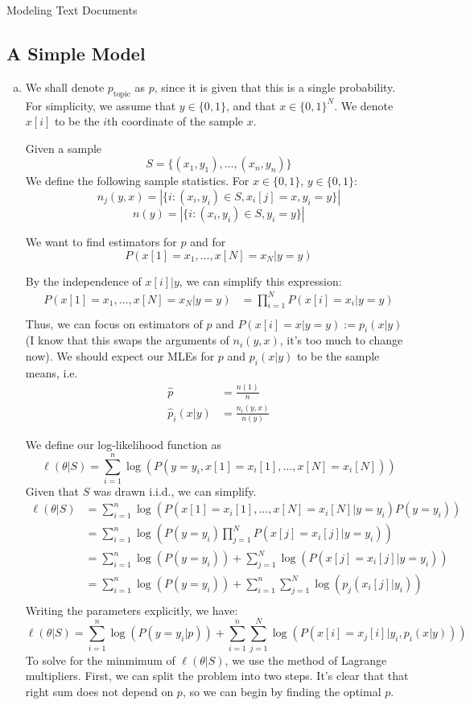 \documentclass{amsart}
\theoremstyle{definition}
\begin{document}
\begin{center}
\LARGE Modeling Text Documents
\end{center}
\subsection{A Simple Model}
\begin{enumerate}[(a)]
  	\item 
		We shall denote $p_{\mathrm{topic}}$ as $p$, since it is given that this is a single probability. 
		For simplicity, we assume that $y \in \{0, 1\}$, and that $x \in \{0, 1\}^N$.
		We denote $x[i]$ to be the $i$th coordinate of the sample $x$. 

		Given a sample 
		\[
		S = \{(x_1,y_1), \ldots, (x_n, y_n)\}
		\]
		We define the following sample statistics. For $x \in \{0,1\}$, $y \in \{0,1\}$:
		\[n_j(y, x) = |\{i : (x_i, y_i)\in S, x_i[j] = x, y_i = y\}|\]
		\[n(y) = |\{i : (x_i, y_i)\in S, y_i = y\}|\]

		We want to find estimators for $p$ and for  
		\[P(x[1] = x_1, \ldots, x[N] = x_N | y = y)\]

		By the independence of $x[i] | y$, we can simplify this expression:
		\begin{align*}
			P(x[1] = x_1, \ldots, x[N] = x_N | y = y) &= \prod_{i=1}^N P(x[i] = x_i | y = y)\\
		\end{align*}
		Thus, we can focus on estimators of $p$ and $P(x[i] = x | y = y) := p_i(x|y)$ (I know that this swaps the arguments of $n_i(y, x)$, it's too much to change now).
		We should expect our MLEs for $p$ and $p_i(x|y)$ to be the sample means, i.e. 
		\begin{align*}
		\hat{p} &= \frac{n(1)}{n}\\
		\hat{p}_i(x|y) &= \frac{n_i(y, x)}{n(y)}
		\end{align*}
		
		We define our log-likelihood function as
		\[\ell(\theta|S) = \sum_{i=1}^{n}\log(P(y = y_i, x[1] = x_i[1], \ldots, x[N] = x_i[N] )) \]
		Given that $S$ was drawn i.i.d., we can simplify.
		\begin{align*}
			\ell(\theta|S) &= \sum_{i=1}^{n}\log(P(x[1] = x_i[1], \ldots, x[N] = x_i[N] | y = y_i)P(y = y_i))  \\
			&= \sum_{i=1}^{n}\log(P(y=y_i)\prod_{j=1}^{N} P(x[j] = x_i[j]|y = y_i))\\
			&= \sum_{i=1}^{n}\log(P(y = y_i)) + \sum_{j=1}^{N} \log(P(x[j] = x_i[j]|y = y_i))\\
			&= \sum_{i=1}^{n}\log(P(y = y_i)) + \sum_{i=1}^{n}\sum_{j=1}^{N} \log(p_j(x_i[j]|y_i))\\
		\end{align*}
		Writing the parameters explicitly, we have:
		\[
		\ell(\theta|S) = \sum_{i=1}^{n}\log(P(y = y_i|p)) + \sum_{i=1}^{n}\sum_{j=1}^{N} \log(P(x[i] = x_j[i]| y_i, p_i(x|y)))
		\]
		To solve for the minmimum of $\ell(\theta|S)$, we use the method of Lagrange multipliers. 
		First, we can split the problem into two steps. It's clear that that right sum does not depend on $p$, 
		so we can begin by finding the optimal $p$.


\end{enumerate}
\end{document}
